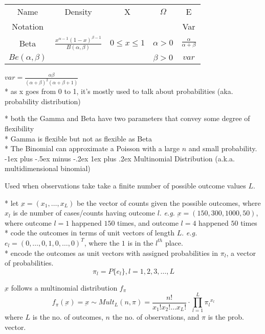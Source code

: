 \documentclass[10pt,landscape]{article}
\makeatletter
\renewcommand{\subsubsection}{\@startsection{subsubsection}{3}{0mm}%
                                {-1ex plus -.5ex minus -.2ex}%
                                {1ex plus .2ex}%
                                {\normalfont\small\bfseries}}
\makeatother
\begin{document}
\begin{multicols}{3}
\begin{center}
\begin{tabular}{ |ccccc| }
\hline
Name & Density & X & $\Omega$ & E \\
Notation &  &  &  & Var \\
\hline
Beta & $\frac{x^{\alpha - 1} (1 - x)^{\beta - 1}}{B(\alpha,\beta)}$ & $0 \leq x \leq 1$ & $\alpha > 0$ & $\frac{\alpha}{\alpha + \beta}$ \\
$Be(\alpha,\beta)$ &  &  & $\beta > 0$ & $var$ \\
\hline
\end{tabular}
\end{center}
$var = \frac{\alpha \beta}{(\alpha + \beta)^2 (\alpha + \beta + 1)}$ \\
* as x goes from 0 to 1, it's mostly used to talk about probabilities (aka. probability distribution)

\medskip
* both the Gamma and Beta have two parameters that convey some degree of flexibility \\
* Gamma is flexible but not as flexible as Beta \\
* The Binomial can approximate a Poisson with a large $n$ and small probability. \\

\subsubsection{Multinomial Distribution (a.k.a. multidimensional binomial)}

Used when observations take take a finite number of possible outcome values $L$.

\medskip
* let $\underbar{x} = (x_1, \hdots , x_L)$ be the vector of counts given the possible outcomes, where $x_l$ is de number of cases/counts having outcome $l$. \emph{e.g.} $\underbar{x} = (150, 300, 1000, 50)$, where outcome $l = 1$ happened $150$ times, and outcome $l = 4$ happened $50$ times \\
* code the outcomes in terms of unit vectors of length $L$. \emph{e.g.} $e_l = {(0, \hdots, 0, 1, 0, \hdots, 0)}^T$, where the $1$ is in the $l^{th}$ place. \\
* encode the outcomes as unit vectors with assigned probabilities in $\pi_l$, a vector of probabilities. $$ \pi_l = P\{e_l\}, l = 1, 2, 3, \hdots, L $$

\medskip
$\underbar{x}$ follows a multinomial distribution $f_{\pi}$ $$ f_{\pi}(\underbar{x}) = \underbar{x} \sim Mult_L(n, \pi) = \frac{n!}{x_1! x_2! \hdots x_L!} \cdot \prod_{l = 1}^{L} {\pi_l}^{x_l} $$
where $L$ is the no. of outcomes, $n$ the no. of observations, and $\pi$ is the prob. vector. \\


\end{multicols}
\end{document}
